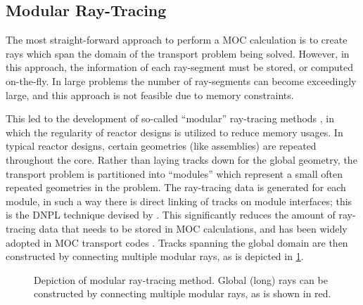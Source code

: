 {{    \subsection{Modular Ray-Tracing}{\label{ssec:RT:Modular Ray-Tracing}
      The most straight-forward approach to perform a \ac{MOC} calculation is to create rays which span the domain of the transport problem being solved.
      However, in this approach, the information of each ray-segment must be stored, or computed on-the-fly.
      In large problems the number of ray-segments can become exceedingly large, and this approach is not feasible due to memory constraints.

      This led to the development of so-called ``modular'' ray-tracing methods \cite{Filippone1980,Saji2000,Wu2003,Kochunas2013}, in which the regularity of reactor designs is utilized to reduce memory usages.
      In typical reactor designs, certain geometries (like assemblies) are repeated throughout the core.
      Rather than laying tracks down for the global geometry, the transport problem is partitioned into ``modules'' which represent a small often repeated geometries in the problem.
      The ray-tracing data is generated for each module, in such a way there is direct linking of tracks on module interfaces; this is the \ac{DNPL} technique devised by \citet{Saji2000}.
      This significantly reduces the amount of ray-tracing data that needs to be stored in \ac{MOC} calculations, and has been widely adopted in \ac{MOC} transport codes \cite{Hong1998,Jung2009,Tang2009,DeCART,APOLLO3,MPACT2016,Hebert2017a}.
      Tracks spanning the global domain are then constructed by connecting multiple modular rays, as is depicted in \cref{fig:MRT:Modular Ray Tracing}.

      \begin{figure}[h]
          \centering
          \def\svgwidth{0.4\linewidth}
          
          \caption{Depiction of modular ray-tracing method. Global (long) rays can be constructed by connecting multiple modular rays, as is shown in red.}
          \label{fig:MRT:Modular Ray Tracing}
      \end{figure}

}}}
